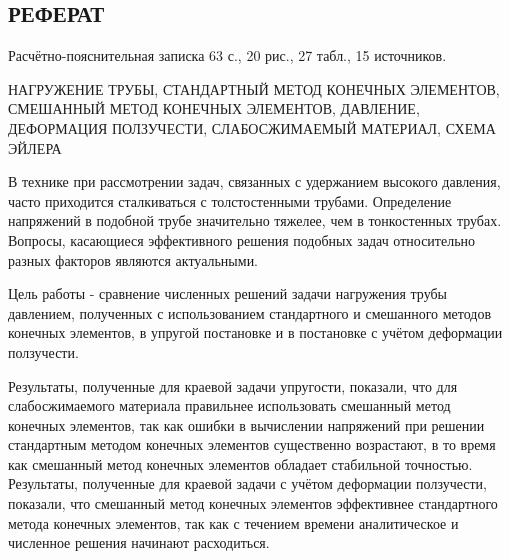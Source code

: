 \documentclass[a4paper,14pt]{extarticle}
\begin{document}
\newpage

\begin{center}
\section*{\centering РЕФЕРАТ}
\end{center}
\setcounter{page}{2}

Расчётно-пояснительная записка 63 с., 20 рис., 27 табл., 15 источников.

НАГРУЖЕНИЕ ТРУБЫ, СТАНДАРТНЫЙ МЕТОД КОНЕЧНЫХ ЭЛЕМЕНТОВ, СМЕШАННЫЙ МЕТОД КОНЕЧНЫХ ЭЛЕМЕНТОВ, ДАВЛЕНИЕ, ДЕФОРМАЦИЯ ПОЛЗУЧЕСТИ, СЛАБОСЖИМАЕМЫЙ МАТЕРИАЛ, СХЕМА ЭЙЛЕРА

В технике при рассмотрении задач, связанных с удержанием высокого давления, часто приходится сталкиваться с толстостенными трубами. Определение напряжений в подобной трубе значительно тяжелее, чем в тонкостенных трубах. Вопросы, касающиеся эффективного решения подобных задач относительно разных факторов являются актуальными. 

Цель работы - сравнение численных решений задачи нагружения трубы давлением, полученных с использованием стандартного и смешанного методов конечных элементов, в упругой постановке и в постановке с учётом деформации ползучести.

Результаты, полученные для краевой задачи упругости, показали, что для слабосжимаемого материала правильнее использовать смешанный метод конечных элементов, так как ошибки в вычислении напряжений при решении стандартным методом конечных элементов существенно возрастают, в то время как смешанный метод конечных элементов обладает стабильной точностью. Результаты, полученные для краевой задачи с учётом деформации ползучести, показали, что смешанный метод конечных элементов эффективнее стандартного метода конечных элементов, так как с течением времени аналитическое и численное решения начинают расходиться. 

\newpage

\renewcommand*\contentsname{\begin{center}СОДЕРЖАНИЕ\end{center}}
	
\tableofcontents
\end{document}
